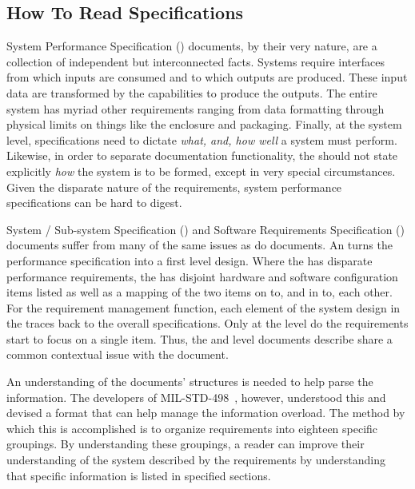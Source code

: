 
\subsection{How To Read Specifications}
\label{loc:Intro_HowToReadSpecifications}

System Performance Specification (\SPS) documents, by their very nature, are a collection of independent but interconnected facts.
Systems require interfaces from which inputs are consumed and to which outputs are produced.
These input data are transformed by the capabilities to produce the outputs.
The entire system has myriad other requirements ranging from data formatting through physical limits on things like the enclosure and packaging.
Finally, at the system level, specifications need to dictate {\em what, and, how well} a system must perform.
Likewise, in order to separate documentation functionality, the \SPS should not state explicitly {\em how} the system is to be formed, except in very special circumstances.
Given the disparate nature of the requirements, system performance specifications can be hard to digest.


System / Sub-system Specification (\SSS) and Software Requirements Specification (\SRS) documents suffer from many of the same issues as do \SPS documents.
An \SSS turns the performance specification into a first level design.
Where the \SPS has disparate performance requirements, the \SSS has disjoint hardware and software configuration items listed as well as a mapping of the two items on to, and in to, each other.
For the requirement management function, each element of the system design in the \SSS traces back to the overall \SPS specifications.
Only at the \SRS level do the requirements start to focus on a single item.
Thus, the \SSS and \SRS level documents describe share a common contextual issue with the \SPS document.


An understanding of the documents' structures is needed to help parse the information.
The developers of MIL-STD-498~\cite{ref__MIL_STD_498}, however, understood this and devised a format that can help manage the information overload.
The method by which this is accomplished is to organize requirements into eighteen specific groupings.
By understanding these groupings, a reader can improve their understanding of the system described by the requirements by understanding that specific information is listed in specified sections.


